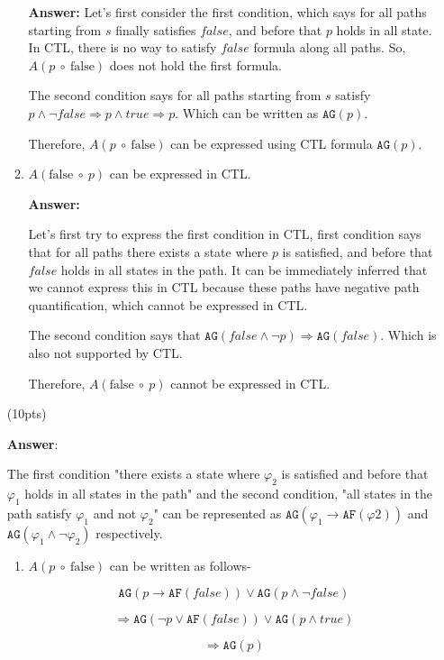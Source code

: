\documentclass[11pt]{article}
\newcommand{\af}[1]{\texttt{AF}(#1)}
\newcommand{\ag}[1]{\texttt{AG}(#1)}
\begin{document}
\begin{enumerate}
\begin{enumerate}
\textbf{Answer:} Let's first consider the first condition, which says for all paths starting from $s$ finally satisfies $false$, and before that $p$ holds in all state. In CTL, there is no way to satisfy $false$ formula along all paths. So, $A(p\ \circ\ \mbox{false})$ does not hold the first formula. 

The second condition says for all paths starting from $s$ satisfy $p \land \neg false \Rightarrow p \land true \Rightarrow p $. Which can be written as $\ag{p}$. 

Therefore, $A(p\ \circ\ \mbox{false})$ can be expressed using CTL formula $\ag{p}$. 


\item $A(\mbox{false}\ \circ\ p)$ can be expressed in CTL.

\textbf{Answer:}

Let's first try to express the first condition in CTL, first condition says that for all paths there exists a state where $p$ is
  satisfied, and before that $false$ holds in all states in the path. It can be immediately inferred that we cannot express this in CTL because these paths have negative path quantification, which cannot be expressed in CTL. 


  The second condition says that  $\ag{false \land \neg p} \Rightarrow \ag{false}$. Which is also not supported by CTL. 

  Therefore, $A(\mbox{false}\ \circ\ p)$ cannot be expressed in CTL. 

\end{enumerate}
\hfill(10pts)

\textbf{Answer}: 

The first condition "there exists a state where $\varphi_2$ is satisfied and before that $\varphi_1$ holds in all states in the
  path" and the second condition, "all states in the path satisfy $\varphi_1$ and not
  $\varphi_2$" can be represented as $\ag{\varphi_1 \rightarrow \af{\varphi2}} $ and $ \ag{\varphi_1 \land \neg \varphi_2}$ respectively.

  \begin{enumerate}
\item $A(p\ \circ\ \mbox{false})$ can be written as follows-

$$\ag{p \rightarrow \af{false}} \lor \ag{p \land \neg false}$$

$$\Rightarrow \ag{\neg p \lor \af{false}} \lor \ag{p \land true}$$

$$\Rightarrow  \ag{p}$$





\end{enumerate}
\end{enumerate}
\end{document}
